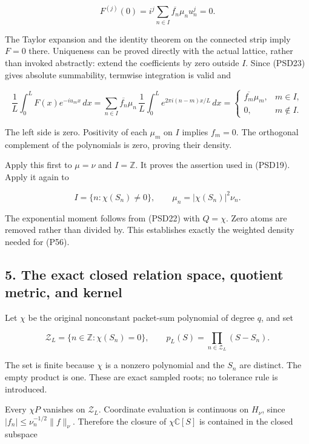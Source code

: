 \[
F^{(j)}(0)=i^j\sum_{n\in I}\overline{f_n}\mu_nu_n^j=0.
\tag{PSD25}
\]

The Taylor expansion and the identity theorem on the connected strip imply \(F=0\) there. Uniqueness can be proved directly with the actual lattice, rather than invoked abstractly: extend the coefficients by zero outside \(I\). Since (PSD23) gives absolute summability, termwise integration is valid and

\[
\frac1L\int_0^L F(x)e^{-iu_mx}\,dx
=\sum_{n\in I}\overline{f_n}\mu_n\,
\frac1L\int_0^L e^{2\pi i(n-m)x/L}\,dx
=\begin{cases}\overline{f_m}\mu_m,&m\in I,\\0,&m\notin I.\end{cases}
\tag{PSD26}
\]

The left side is zero. Positivity of each \(\mu_m\) on \(I\) implies \(f_m=0\). The orthogonal complement of the polynomials is zero, proving their density.

Apply this first to \(\mu=\nu\) and \(I=\mathbb Z\). It proves the assertion used in (PSD19). Apply it again to

\[
I=\{n:\chi(S_n)\ne0\},\qquad
\mu_n=|\chi(S_n)|^2\nu_n.
\tag{PSD27}
\]

The exponential moment follows from (PSD22) with \(Q=\chi\). Zero atoms are removed rather than divided by. This establishes exactly the weighted density needed for (P56).

\subsection{5. The exact closed relation space, quotient metric, and kernel}\label{the-exact-closed-relation-space-quotient-metric-and-kernel}

Let \(\chi\) be the original nonconstant packet-sum polynomial of degree \(q\), and set

\[
\mathcal Z_L=\{n\in\mathbb Z:\chi(S_n)=0\},\qquad
p_L(S)=\prod_{n\in\mathcal Z_L}(S-S_n).
\tag{PSD28}
\]

The set is finite because \(\chi\) is a nonzero polynomial and the \(S_n\) are distinct. The empty product is one. These are exact sampled roots; no tolerance rule is introduced.

Every \(\chi P\) vanishes on \(\mathcal Z_L\). Coordinate evaluation is continuous on \(H_\nu\), since \(|f_n|\le\nu_n^{-1/2}\|f\|_\nu\). Therefore the closure of \(\chi \mathbb{C}[S]\) is contained in the closed subspace

